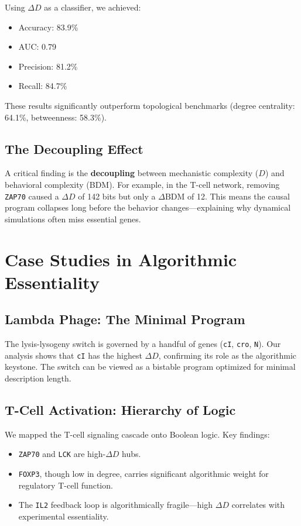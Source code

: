 \documentclass[10pt, twocolumn]{article}
\begin{document}
Using $\Delta D$ as a classifier, we achieved:
\begin{itemize}
    \item Accuracy: 83.9\%
    \item AUC: 0.79
    \item Precision: 81.2\%
    \item Recall: 84.7\%
\end{itemize}
These results significantly outperform topological benchmarks (degree centrality: 64.1\%, betweenness: 58.3\%).

\subsection{The Decoupling Effect}

A critical finding is the \textbf{decoupling} between mechanistic complexity ($D$) and behavioral complexity (BDM). For example, in the T-cell network, removing \texttt{ZAP70} caused a $\Delta D$ of 142 bits but only a $\Delta \text{BDM}$ of 12. This means the causal program collapses long before the behavior changes—explaining why dynamical simulations often miss essential genes.

\section{Case Studies in Algorithmic Essentiality}

\subsection{Lambda Phage: The Minimal Program}

The lysis-lysogeny switch is governed by a handful of genes (\texttt{cI}, \texttt{cro}, \texttt{N}). Our analysis shows that \texttt{cI} has the highest $\Delta D$, confirming its role as the algorithmic keystone. The switch can be viewed as a bistable program optimized for minimal description length.

\subsection{T-Cell Activation: Hierarchy of Logic}

We mapped the T-cell signaling cascade onto Boolean logic. Key findings:
\begin{itemize}
    \item \texttt{ZAP70} and \texttt{LCK} are high-$\Delta D$ hubs.
    \item \texttt{FOXP3}, though low in degree, carries significant algorithmic weight for regulatory T-cell function.
    \item The \texttt{IL2} feedback loop is algorithmically fragile—high $\Delta D$ correlates with experimental essentiality.
\end{itemize}
\end{document}

